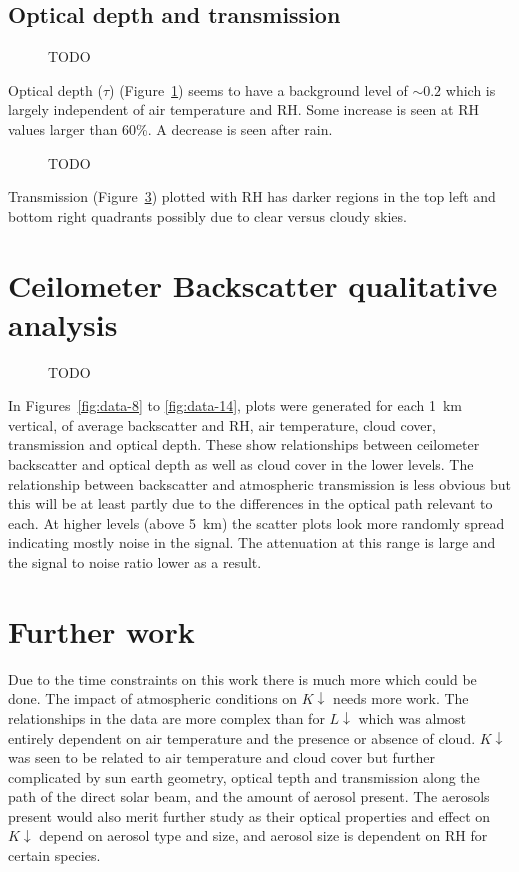 \documentclass[a4paper,titlepage, twoside]{report}
\newcommand\Kdown{K\!\!\downarrow}
\newcommand\Ldown{L\!\!\downarrow}
\begin{document}
\subsection{Optical depth and transmission}
\begin{figure}
\centering
\caption{TODO}
\label{fig:data-5}
\end{figure}

Optical depth ($\tau$) (Figure~\ref{fig:data-5}) seems to have a background level of $\sim 0.2$ which is largely independent of air temperature and RH. Some increase is seen at RH values larger than 60\%. A decrease is seen after rain.

\begin{figure}
\centering
\caption{TODO}
\label{fig:data-6}
\end{figure}

Transmission (Figure~\ref{fig:data-6}) plotted with RH has darker regions in the top left and bottom right quadrants possibly due to clear versus cloudy skies.

\section{Ceilometer Backscatter qualitative analysis}
\begin{figure}
\centering
\caption{TODO}
\label{fig:data-6}
\end{figure}

In Figures~\ref{fig:data-8} to \ref{fig:data-14}, plots were generated for each \SI{1}{\kilo\meter} vertical, of average backscatter and RH, air temperature, cloud cover, transmission and optical depth. These show relationships between ceilometer  backscatter and optical depth as well as cloud cover in the lower levels. The relationship between backscatter and atmospheric transmission is less obvious but this will be at least partly due to the differences in the optical path relevant to each. At higher levels (above \SI{5}{\kilo\meter}) the scatter plots look more randomly spread indicating mostly noise in the signal. The attenuation at this range is large and the signal to noise ratio lower as a result.

\section{Further work}
Due to the time constraints on this work there is much more which could be done. The impact of atmospheric conditions on $\Kdown$ needs more work. The relationships in the data are more complex than for $\Ldown$ which was almost entirely dependent on air temperature and the presence or absence of cloud. $\Kdown$ was seen to be related to air temperature and cloud cover but further complicated by sun earth geometry, optical tepth and transmission along the path of the direct solar beam, and the amount of aerosol present. The aerosols present would also merit further study as their optical properties and effect on $\Kdown$ depend on aerosol type and size, and aerosol size is dependent on RH for certain species.
\end{document}
